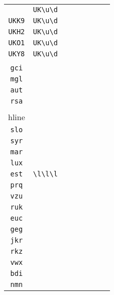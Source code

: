 \begin{longtable}{cccccccc}
\begin{tabular}{ll}
    \verb|UKM3| & \verb|UK\u\d|\\
\verb|UKK9| & \verb|UK\u\d|\\
\verb|UKH2| & \verb|UK\u\d|\\
\verb|UKO1| & \verb|UK\u\d|\\
\verb|UKY8| & \verb|UK\u\d|
\end{tabular}
\\\midrule 
\begin{tabular}{l}
    \verb|sri|\\
\verb|gci|\\
\verb|mgl|\\
\verb|aut|\\
\verb|rsa|\\
\\hline\\
\verb|slo|\\
\verb|syr|\\
\verb|mar|\\
\verb|lux|\\
\verb|est|
\end{tabular}

&
\verb|\l\l\l|
&

\begin{tabular}{l}
    \verb|\l\l\l|\\
\verb|prq|\\
\verb|vzu|\\
\verb|ruk|\\
\verb|euc|\\
\verb|geg|
\end{tabular}

&

\begin{tabular}{l}
    \verb|\l\l\l|\\
\verb|jkr|\\
\verb|rkz|\\
\verb|vwx|\\
\verb|bdi|\\
\verb|nmn|
\end{tabular}

&


\end{longtable}
